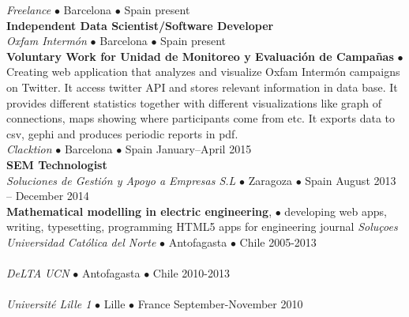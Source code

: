 \documentclass[a4paper, twoside]{scrreprt}
\begin{document}
\vspace{0.1cm}

\noindent{}\textit{Freelance} $\bullet$ 
Barcelona $\bullet$ Spain \hfill present\\
\noindent\textbf{\small Independent Data Scientist/Software Developer} \\
\noindent{}\textit{Oxfam Intermón} $\bullet$ 
Barcelona $\bullet$ Spain \hfill present\\
\noindent\textbf{\small Voluntary Work for Unidad de Monitoreo y Evaluación de Campañas} $\bullet$ 
{\small Creating web application that analyzes and visualize Oxfam Intermón
  campaigns on Twitter. It access twitter API and stores relevant
  information in data base. It provides different
  statistics together with different
  visualizations like graph of connections, maps showing
  where participants come from etc. It exports data to csv, gephi and
  produces periodic
  reports in pdf. }\\
\noindent{}\textit{Clacktion} $\bullet$ 
Barcelona $\bullet$ Spain \hfill January--April 2015\\
\noindent\textbf{\small SEM Technologist}\\ 
\noindent{}\textit{Soluciones de Gestión y Apoyo a Empresas S.L} 
$\bullet$ Zaragoza $\bullet$ Spain \hfill August 2013 -- December 2014\\
\noindent\textbf{\small Mathematical modelling in electric engineering}, $\bullet$ 
{\small developing web apps, writing, typesetting, programming HTML5 apps
for engineering journal \emph{Soluçoes}}\\
\noindent{}\textit{Universidad Católica del Norte} $\bullet$ 
Antofagasta $\bullet$ Chile \hfill 2005-2013\\
\\
\noindent{}\textit{DeLTA UCN} $\bullet$ 
Antofagasta $\bullet$ Chile \hfill 2010-2013\\
\\
\noindent{}\textit{Universit{\'e} Lille 1} $\bullet$ Lille $\bullet$ France \hfill September-November 2010\\
\end{document}
